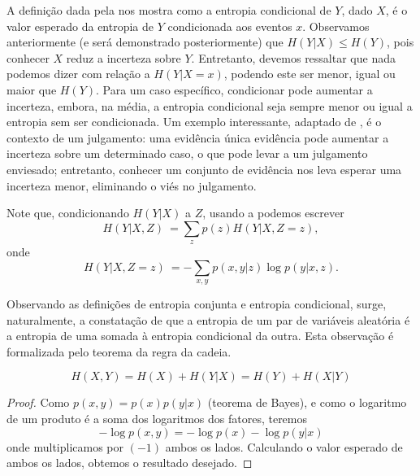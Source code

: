 A definição dada pela  nos mostra como a entropia
condicional de $Y$, dado $X$, é o valor esperado da entropia de $Y$
condicionada aos eventos $x$.  Observamos anteriormente (e será demonstrado
posteriormente) que $H(Y|X) \leq H(Y)$, pois conhecer $X$ reduz a incerteza
sobre $Y$. Entretanto, devemos ressaltar que nada podemos dizer com relação a
$H(Y|X=x)$, podendo este ser menor, igual ou maior que $H(Y)$. Para um caso
específico, condicionar pode aumentar a incerteza, embora, na média, a entropia
condicional seja sempre menor ou igual a entropia sem ser condicionada. Um
exemplo interessante, adaptado de \textcite{cover2006}, é o contexto de um
julgamento: uma evidência única evidência pode aumentar a incerteza sobre um
determinado caso, o que pode levar a um julgamento enviesado; entretanto,
conhecer um conjunto de evidência nos leva esperar uma incerteza menor,
eliminando o viés no julgamento.

Note que, condicionando $H(Y|X)$ a $Z$, usando a  podemos
escrever
\begin{equation}\label{eq:entcondeventsZ}
H(Y|X,Z) \: = \sum_z p(z) H(Y|X,Z=z),
\end{equation}
onde 
\begin{equation}\label{eq:entcondeventsZz}
H(Y|X,Z=z) \: = -\sum_{x,y} p(x,y|z) \log p(y|x,z) .
\end{equation}

Observando as definições de entropia conjunta e entropia condicional, surge, naturalmente,
a constatação de que a entropia de um par de variáveis aleatória é a entropia de uma
somada à entropia condicional da outra. Esta observação é formalizada pelo teorema
da regra da cadeia.

\begin{theorem}\label{thm:regracadeia}
 \begin{equation}
  H(X,Y) = H(X) + H(Y|X) = H(Y) + H(X|Y)
 \end{equation}
\end{theorem}
\begin{proof}
 Como $p(x,y) = p(x) p(y|x)$ (teorema de Bayes), e como o logaritmo de um produto é a soma 
 dos logaritmos dos fatores, teremos
 \begin{equation}
 - \log p(x,y) = - \log p(x) - \log p(y|x)
 \end{equation}
 onde multiplicamos por $(-1)$ ambos os lados.
 Calculando o valor esperado de ambos os lados, obtemos o resultado desejado.
\end{proof}


